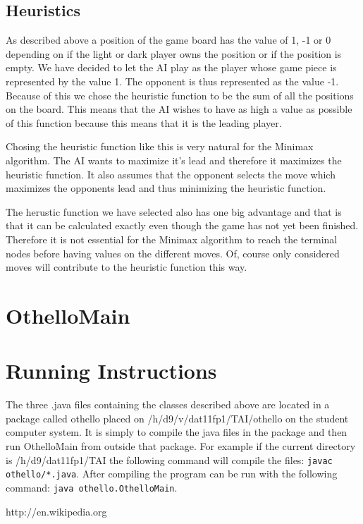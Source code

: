 \documentclass[a4paper]{article}
\begin{document}
\subsection{Heuristics}
As described above a position of the game board has the value of 1, -1 or 0 depending on if the light or dark player owns the position or if the position is empty. We have decided to let the AI play as the player whose game piece is represented by the value 1. The opponent is thus represented as the value -1. Because of this we chose the heuristic function to be the sum of all the positions on the board. This means that the AI wishes to have as high a value as possible of this function because this means that it is the leading player.

Chosing the heuristic function like this is very natural for the Minimax algorithm. The AI wants to maximize it's lead and therefore it maximizes the heuristic function. It also assumes that the opponent selects the move which maximizes the opponents lead and thus minimizing the heuristic function.

The herustic function we have selected also has one big advantage and that is that it can be calculated exactly even though the game has not yet been finished. Therefore it is not essential for the Minimax algorithm to reach the terminal nodes before having values on the different moves. Of, course only considered moves will contribute to the heuristic function this way.




\section{OthelloMain}

\section{Running Instructions}
The three .java files containing the classes described above are located in a package called othello placed on /h/d9/v/dat11fp1/TAI/othello on the student computer system. It is simply to compile the java files in the package and then run OthelloMain from outside that package. For example if the current directory is /h/d9/dat11fp1/TAI the following command will compile the files: \texttt{javac othello/*.java}. After compiling the program can be run with the following command: \texttt{java othello.OthelloMain}.

\begin{thebibliography}{1}
http://en.wikipedia.org
\end{thebibliography}
\end{document}
